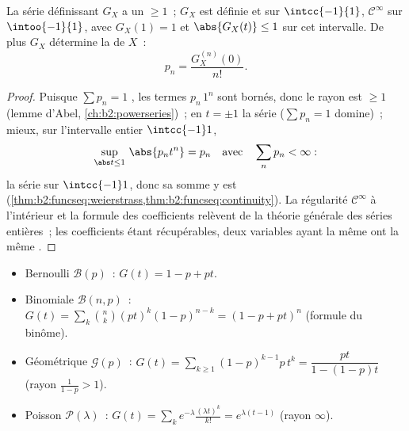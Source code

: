 \begin{proposition}\label{prop:b2:genfun:radius}
La série définissant $G_X$ a un  $\geq 1$~;
$G_X$ est définie et  sur $\intcc{-1}{1}$,
$\mathcal{C}^\infty$ sur $\intoo{-1}{1}$, avec $G_X(1) = 1$ et
$\abs{G_X(t)} \leq 1$ sur cet intervalle. De plus $G_X$ détermine la
 de $X$~:
\[
p_n = \frac{G_X^{(n)}(0)}{n!} .
\]
\end{proposition}

\begin{proof}
Puisque $\sum p_n = 1$ , les termes $p_n\,1^n$ sont bornés,
donc le rayon est $\geq 1$ (lemme d'Abel,
\cref{ch:b2:powerseries})~; en $t = \pm1$ la série 
 ($\sum p_n = 1$ domine)~; mieux, sur l'intervalle entier
$\intcc{-1}1$,
\[
\sup_{\abs t\leq1}\,\abs{p_nt^n} = p_n
\quad\text{avec}\quad \sum_np_n < \infty :
\]
la série  \emph{} sur $\intcc{-1}1$, donc
sa somme y est 
(\cref{thm:b2:funcseq:weierstrass,thm:b2:funcseq:continuity}). La
régularité $\mathcal C^\infty$ à l'intérieur et la formule des
coefficients relèvent de la théorie générale des séries entières~; les
coefficients étant récupérables, deux variables ayant la même  ont la même .
\end{proof}

\begin{example}\label{ex:b2:genfun:classical}
\leavevmode
\begin{itemize}
\item Bernoulli $\mathcal{B}(p)$~: $G(t) = 1 - p + pt$.
\item Binomiale $\mathcal{B}(n, p)$~: $G(t) = \sum_k \binom nk
(pt)^k(1-p)^{n-k} = (1 - p + pt)^n$ (formule du binôme).
\item Géométrique $\mathcal{G}(p)$~: $G(t) =
\sum_{k\geq1}(1-p)^{k-1}p\,t^k = \dfrac{pt}{1 - (1-p)t}$ (rayon
$\frac{1}{1-p} > 1$).
\item Poisson $\mathcal{P}(\lambda)$~: $G(t) =
\sum_k e^{-\lambda}\frac{(\lambda t)^k}{k!} = e^{\lambda(t - 1)}$
(rayon $\infty$).
\end{itemize}
\end{example}

